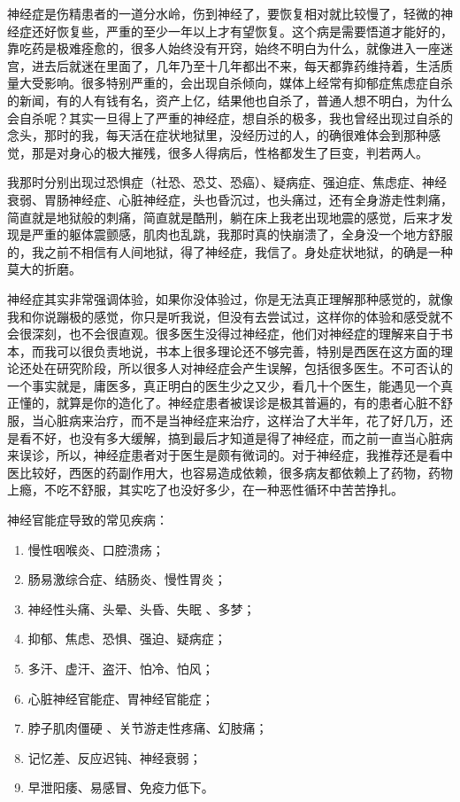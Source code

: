 \documentclass[fontset=founder]{ctexart}
\begin{document}
神经症是伤精患者的一道分水岭，伤到神经了，要恢复相对就比较慢了，轻微的神经症还好恢复些，严重的至少一年以上才有望恢复。这个病是需要悟道才能好的，靠吃药是极难痊愈的，很多人始终没有开窍，始终不明白为什么，就像进入一座迷宫，进去后就迷在里面了，几年乃至十几年都出不来，每天都靠药维持着，生活质量大受影响。很多特别严重的，会出现自杀倾向，媒体上经常有抑郁症焦虑症自杀的新闻，有的人有钱有名，资产上亿，结果他也自杀了，普通人想不明白，为什么会自杀呢？其实一旦得上了严重的神经症，想自杀的极多，我也曾经出现过自杀的念头，那时的我，每天活在症状地狱里，没经历过的人，的确很难体会到那种感觉，那是对身心的极大摧残，很多人得病后，性格都发生了巨变，判若两人。

我那时分别出现过恐惧症（社恐、恐艾、恐癌）、疑病症、强迫症、焦虑症、神经衰弱、胃肠神经症、心脏神经症，头也昏沉过，也头痛过，还有全身游走性刺痛，简直就是地狱般的刺痛，简直就是酷刑，躺在床上我老出现地震的感觉，后来才发现是严重的躯体震颤感，肌肉也乱跳，我那时真的快崩溃了，全身没一个地方舒服的，我之前不相信有人间地狱，得了神经症，我信了。身处症状地狱，的确是一种莫大的折磨。

神经症其实非常强调体验，如果你没体验过，你是无法真正理解那种感觉的，就像我和你说蹦极的感觉，你只是听我说，但没有去尝试过，这样你的体验和感受就不会很深刻，也不会很直观。很多医生没得过神经症，他们对神经症的理解来自于书本，而我可以很负责地说，书本上很多理论还不够完善，特别是西医在这方面的理论还处在研究阶段，所以很多人对神经症会产生误解，包括很多医生。不可否认的一个事实就是，庸医多，真正明白的医生少之又少，看几十个医生，能遇见一个真正懂的，就算是你的造化了。神经症患者被误诊是极其普遍的，有的患者心脏不舒服，当心脏病来治疗，而不是当神经症来治疗，这样治了大半年，花了好几万，还是看不好，也没有多大缓解，搞到最后才知道是得了神经症，而之前一直当心脏病来误诊，所以，神经症患者对于医生是颇有微词的。对于神经症，我推荐还是看中医比较好，西医的药副作用大，也容易造成依赖，很多病友都依赖上了药物，药物上瘾，不吃不舒服，其实吃了也没好多少，在一种恶性循环中苦苦挣扎。

神经官能症导致的常见疾病：

\begin{enumerate}
    \item 慢性咽喉炎、口腔溃疡；
    \item 肠易激综合症、结肠炎、慢性胃炎；
    \item 神经性头痛、头晕、头昏、失眠 、多梦；
    \item 抑郁、焦虑、恐惧、强迫、疑病症；
    \item 多汗、虚汗、盗汗、怕冷、怕风；
    \item 心脏神经官能症、胃神经官能症；
    \item 脖子肌肉僵硬 、关节游走性疼痛、幻肢痛；
    \item 记忆差、反应迟钝、神经衰弱；
    \item 早泄阳痿、易感冒、免疫力低下。
\end{enumerate}
\end{document}

